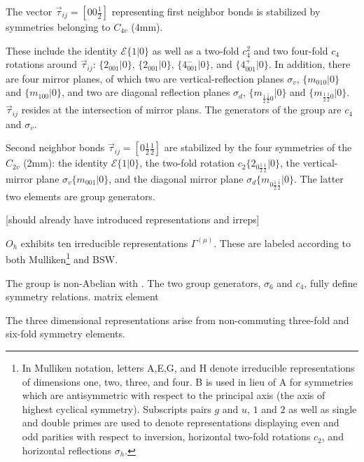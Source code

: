 \documentclass[twocolumn,showpacs,preprintnumbers,superscriptaddress,prb,floatfix,aps,10pt]{revtex4-1}
\newcommand*{\id}{\mathcal{E}}
\newcommand*{\bondvec}{\vec{\tau}_{ij}}
\newcommand{\seitz}[2]{\{#1|#2\}}
\begin{document}
The vector $\bondvec = [00\frac{1}{2}]$ representing first neighbor bonds is stabilized by symmetries belonging to $C_{4v}$ (4mm). 

These include the identity $\id \seitz{1}{0}$ as well as a two-fold $c_{4}^2$ and two four-fold $c_{4}$ rotations around $\bondvec$: $\seitz{2_{001}}{0}$, $\seitz{2_{001}}{0}$, $\seitz{4^-_{001}}{0}$, and $\seitz{4^+_{001}}{0}$. In addition, there are four mirror planes, of which two are vertical-reflection planes $\sigma_v$, $\seitz{m_{010}}{0}$ and $\seitz{m_{100}}{0}$, 
and two are diagonal reflection planes $\sigma_d$, $\seitz{m_{\frac{1}{2}\bar{\frac{1}{2}}0}}{0}$ and $\seitz{m_{\frac{1}{2}\frac{1}{2}0}}{0}$. $\bondvec$ resides at the intersection of mirror plans. The generators of the group are $c_4$ and $\sigma_v$.

Second neighbor bonds $\bondvec = [0\frac{1}{2}\frac{1}{2}]$ are stabilized by the four symmetries of the $C_{2v}$ (2mm): the identity $\id \seitz{1}{0}$, the two-fold rotation $c_2 \seitz{ 2_{0\frac{1}{2}\frac{1}{2}} }{0}$, the vertical-mirror plane $\sigma_v \seitz{m_{001}}{0}$, and the diagonal mirror plane $\sigma_d \seitz{m_{0\frac{1}{2}\bar{\frac{1}{2}}}}{0}$. The latter two elements are group generators.

[should already have introduced representations and irreps]

$O_h$ exhibits ten irreducible representations $\Gamma^{(\mu)}$. These are labeled according to both Mulliken\footnote{In Mulliken notation, letters A,E,G, and H denote irreducible representations of dimensions one, two, three, and four. B is used in lieu of A for symmetries which are antisymmetric with respect to the principal axis (the axis of highest cyclical symmetry). Subscripts pairs $g$ and $u$, $1$ and $2$ as well as single and double primes are used to denote representations displaying even and odd parities with respect to inversion, horizontal two-fold rotations $c_2$, and horizontal reflections $\sigma_h$.} and BSW.


The group is non-Abelian with . The two group generators, $\sigma_6$ and $c_4$, fully define symmetry relations.
matrix element 


The three dimensional representations arise from non-commuting three-fold and six-fold symmetry elements. 
\end{document}
